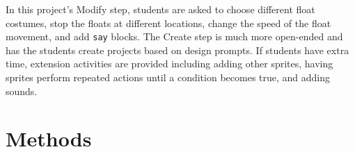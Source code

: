 \documentclass[sigconf,manuscript,review,anonymous]{acmart} %
\def\ts{TIPP\&SEE}
\def\umc{Use\begin{math}\rightarrow\end{math}Modify\begin{math}\rightarrow\end{math}Create\ }
\newcommand{\pratham}[1]{\textcolor{orange}{\textit{Pratham: #1}}}
\begin{document}
In this project's Modify step, students are asked to choose different float costumes, stop the floats at different locations, change the speed of the float movement, and add \texttt{say} blocks. The Create step is much more open-ended and has the students create projects based on design prompts. If students have extra time, extension activities are provided including adding other sprites, having sprites perform repeated actions until a condition becomes true, and adding sounds.




\section{Methods}
\label{sec:methods}
\end{document}
